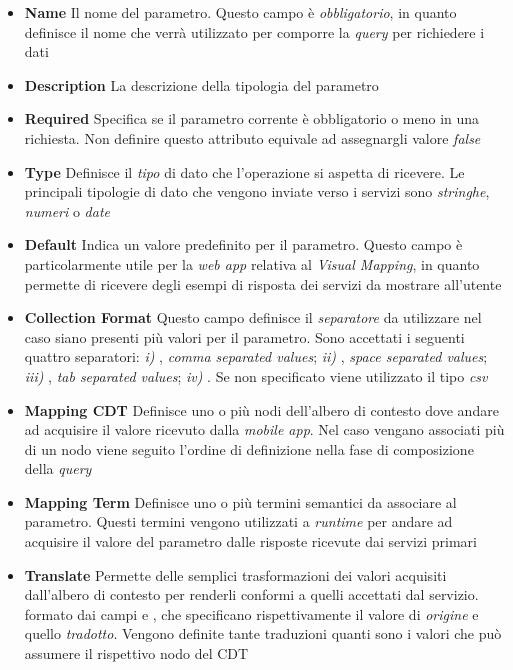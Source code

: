 \begin{itemize}
	\item \textbf{Name}
	Il nome del parametro. Questo campo è \emph{obbligatorio}, in quanto definisce il nome che verrà utilizzato per comporre la \emph{query} per richiedere i dati
	\item \textbf{Description}
	La descrizione della tipologia del parametro
	\item \textbf{Required}
	Specifica se il parametro corrente è obbligatorio o meno in una richiesta. Non definire questo attributo equivale ad assegnargli valore \emph{false}
	\item \textbf{Type}
	Definisce il \emph{tipo} di dato che l'operazione si aspetta di ricevere. Le principali tipologie di dato che vengono inviate verso i servizi sono \emph{stringhe}, \emph{numeri} o \emph{date}
	\item \textbf{Default}
	Indica un valore predefinito per il parametro. Questo campo è particolarmente utile per la \emph{web app} relativa al \emph{Visual Mapping}, in quanto permette di ricevere degli esempi di risposta dei servizi da mostrare all'utente
	\item \textbf{Collection Format}
	Questo campo definisce il \emph{separatore} da utilizzare nel caso siano presenti più valori per il parametro. Sono accettati i seguenti quattro separatori: \emph{i)} , \emph{comma separated values}; \emph{ii)} , \emph{space separated values}; \emph{iii)} , \emph{tab separated values}; \emph{iv)} . Se non specificato viene utilizzato il tipo \emph{csv}
	\item \textbf{Mapping CDT}
	Definisce uno o più nodi dell'albero di contesto dove andare ad acquisire il valore ricevuto dalla \emph{mobile app}. Nel caso vengano associati più di un nodo viene seguito l'ordine di definizione nella fase di composizione della \emph{query}
	\item \textbf{Mapping Term}
	Definisce uno o più termini semantici da associare al parametro. Questi termini vengono utilizzati a \emph{runtime} per andare ad acquisire il valore del parametro dalle risposte ricevute dai servizi primari
	\item \textbf{Translate}
	Permette delle semplici trasformazioni dei valori acquisiti dall'al\-be\-ro di contesto per renderli conformi a quelli accettati dal servizio. \upe formato dai campi  e , che specificano rispettivamente il valore di \emph{origine} e quello \emph{tradotto}. Vengono definite tante traduzioni quanti sono i valori che può assumere il rispettivo nodo del CDT
\end{itemize}

